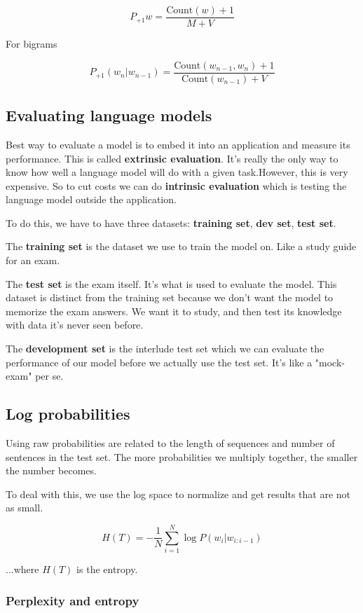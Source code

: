 \documentclass[11pt]{article}
\begin{document}
\[
	P_{+1}w = \frac{\text{Count}(w) + 1}{M+V}
\]

For bigrams

\[
	P_{+1}(w_n|w_{n-1}) = \frac{\text{Count}(w_{n-1},w_n)+1}{\text{Count}(w_{n-1})+V}
\]

\subsection{Evaluating language models}

Best way to evaluate a model is to embed it into an application and measure its
performance. This is called \textbf{extrinsic evaluation}. It's really the only
way to know how well a language model will do with a given task.However, this is
very expensive. So to cut costs we can do \textbf{intrinsic evaluation} which is
testing the language model outside the application.

To do this, we have to have three datasets: \textbf{training set}, \textbf{dev
	set}, \textbf{test set}.

The \textbf{training set} is the dataset we use to train the model on. Like a
study guide for an exam.

The \textbf{test set} is the exam itself. It's what is used to evaluate the
model. This dataset is distinct from the training set because we don't want the
model to memorize the exam answers. We want it to study, and then test its
knowledge with data it's never seen before.

The \textbf{development set} is the interlude test set which we can evaluate the
performance of our model before we actually use the test set. It's like a
"mock-exam" per se.

\subsection{Log probabilities}

Using raw probabilities are related to the length of sequences and number of
sentences in the test set. The more probabilities we multiply together, the
smaller the number becomes.

To deal with this, we use the log space to normalize and get results that are
not as small.

\[
	H(T) = -\frac1N \sum_{i=1}^N \log P(w_i|w_{i:i-1})
\]

...where $H(T)$ is the entropy.

\subsubsection{Perplexity and entropy}
\end{document}
